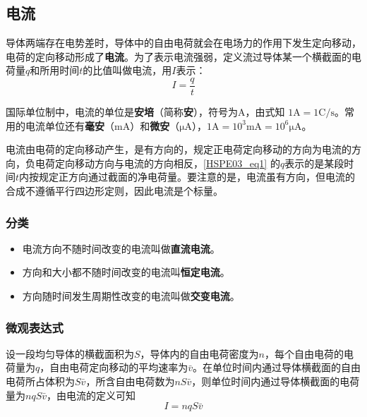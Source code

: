

\subsection{电流}

导体两端存在电势差时，导体中的自由电荷就会在电场力的作用下发生定向移动，电荷的定向移动形成了\textbf{电流}。为了表示电流强弱，定义流过导体某一个横截面的电荷量$q$和所用时间$t$的比值叫做电流，用$I$表示：
\begin{equation}\label{HSPE03_eq1}
I = \frac{q}{t}
\end{equation}

国际单位制中，电流的单位是\textbf{安培}（简称\textbf{安}），符号为$\mathrm{A}$，由式知 $1\mathrm{A} = 1\mathrm{C}/\mathrm{s}$。常用的电流单位还有\textbf{毫安}（$\mathrm{mA}$）和\textbf{微安}（$\mathrm{\mu A}$），$1\mathrm{A}=10^3\mathrm{mA}=10^6\mathrm{\mu A}$。

电流由电荷的定向移动产生，是有方向的，规定正电荷定向移动的方向为电流的方向，负电荷定向移动方向与电流的方向相反，\autoref{HSPE03_eq1} 的$q$表示的是某段时间$t$内按规定正方向通过截面的净电荷量。要注意的是，电流虽有方向，但电流的合成不遵循平行四边形定则，因此电流是个标量。

\subsubsection{分类}
\begin{itemize}
\item 电流方向不随时间改变的电流叫做\textbf{直流电流}。
\item 方向和大小都不随时间改变的电流叫\textbf{恒定电流}。
\item 方向随时间发生周期性改变的电流叫做\textbf{交变电流}。
\end{itemize}

\subsubsection{微观表达式}

设一段均匀导体的横截面积为$S$，导体内的自由电荷密度为$n$，每个自由电荷的电荷量为$q$，自由电荷定向移动的平均速率为$\bar v$。在单位时间内通过导体横截面的自由电荷所占体积为$S\bar v $，所含自由电荷数为$nS\bar v $，则单位时间内通过导体横截面的电荷量为$nqS\bar v$，由电流的定义可知
\begin{equation}
I=nqS\bar v
\end{equation}

